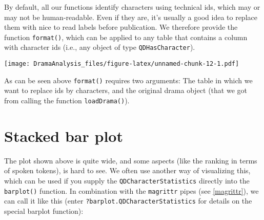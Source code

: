 \documentclass[]{book}
\newenvironment{Shaded}{\begin{snugshade}}{\end{snugshade}}
\newcommand{\CommentTok}[1]{\textcolor[rgb]{0.56,0.35,0.01}{\textit{#1}}}
\newcommand{\DataTypeTok}[1]{\textcolor[rgb]{0.13,0.29,0.53}{#1}}
\newcommand{\DecValTok}[1]{\textcolor[rgb]{0.00,0.00,0.81}{#1}}
\newcommand{\KeywordTok}[1]{\textcolor[rgb]{0.13,0.29,0.53}{\textbf{#1}}}
\newcommand{\NormalTok}[1]{#1}
\newcommand{\OperatorTok}[1]{\textcolor[rgb]{0.81,0.36,0.00}{\textbf{#1}}}
\newcommand{\OtherTok}[1]{\textcolor[rgb]{0.56,0.35,0.01}{#1}}
\newcommand{\StringTok}[1]{\textcolor[rgb]{0.31,0.60,0.02}{#1}}
\begin{document}
By default, all our functions identify characters using technical ids, which may or may not be human-readable. Even if they are, it's usually a good idea to replace them with nice to read labels before publication. We therefore provide the function \texttt{format()}, which can be applied to any table that contains a column with character ids (i.e., any object of type \texttt{QDHasCharacter}).

\begin{Shaded}
\end{Shaded}

\texttt{[image: DramaAnalysis\_files/figure-latex/unnamed-chunk-12-1.pdf]}

As can be seen above \texttt{format()} requires two arguments: The table in which we want to replace ids by characters, and the original drama object (that we got from calling the function \texttt{loadDrama()}).

\hypertarget{stacked-bar-plot}{%
\section{Stacked bar plot}\label{stacked-bar-plot}}

The plot shown above is quite wide, and some aspects (like the ranking in terms of spoken tokens), is hard to see. We often use another way of visualizing this, which can be used if you supply the \texttt{QDCharacterStatistics} directly into the \texttt{barplot()} function. In combination with the \texttt{magrittr} pipes (see \ref{magrittr}), we can call it like this (enter \texttt{?barplot.QDCharacterStatistics} for details on the special barplot function):
\end{document}

